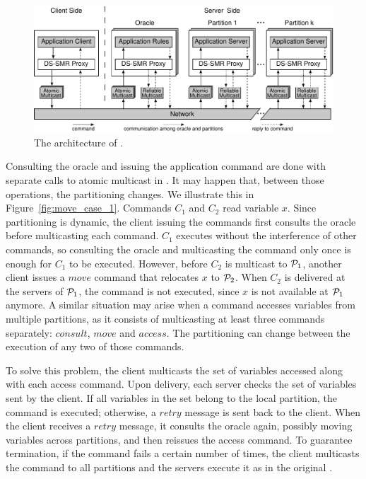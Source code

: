 \begin{figure}
\begin{minipage}[b]{1.0\linewidth} %
\centering
      \includegraphics[width=0.8\linewidth]{figures/arch}
\end{minipage}
\caption{The architecture of \dssmrlong{}.}
\label{fig:arch}
\end{figure}

Consulting the oracle and issuing the application command are done with separate calls to atomic multicast in \dssmr{}.
It may happen that, between those operations, the partitioning changes.
We illustrate this in Figure~\ref{fig:move_case_1}.
Commands $C_1$ and $C_2$ read variable $x$.
Since partitioning is dynamic, the client issuing the commands first consults the oracle before multicasting each command.
$C_1$ executes without the interference of other commands, so consulting the oracle and multicasting the command only once is enough for $C_1$ to be executed.
However, before $C_2$ is multicast to $\mathcal{P}_1$, another client issues a $move$ command that relocates $x$ to $\mathcal{P}_2$.
When $C_2$ is delivered at the servers of $\mathcal{P}_1$, the command is not executed, since $x$ is not available at $\mathcal{P}_1$ anymore.
A similar situation may arise when a command accesses variables from multiple partitions, as it consists of multicasting at least three commands separately: $consult$, $move$ and $access$.
The partitioning can change between the execution of any two of those commands.




To solve this problem, the client multicasts the set of variables accessed along with each access command.
Upon delivery, each server checks the set of variables sent by the client.
If all variables in the set belong to the local partition, the command is executed; otherwise, a $retry$ message is sent back to the client.
When the client receives a $retry$ message, it consults the oracle again, possibly moving variables across partitions, and then reissues the access command.
To guarantee termination, if the command fails a certain number of times, the client multicasts the command to all partitions and the servers execute it as in the original \ssmr{}.

